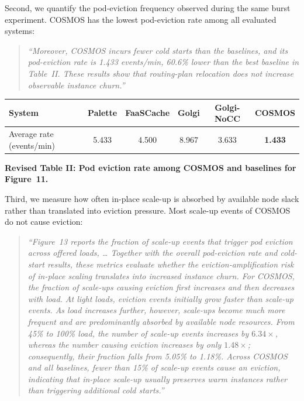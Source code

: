 \documentclass[11pt]{article}
\newcommand{\sysname}{COSMOS\xspace}
\newenvironment{revisionquote}{\begin{quote}\itshape}{\end{quote}}
\begin{document}
Second, we quantify the pod-eviction frequency observed during the same burst experiment. COSMOS has the lowest pod-eviction rate among all evaluated systems:

\begin{revisionquote}
``Moreover, COSMOS incurs fewer cold starts than the baselines, and its pod-eviction rate is 1.433 events/min, 60.6\% lower than the best baseline in Table~II. These results show that routing-plan relocation does not increase observable instance churn.''
\end{revisionquote}

\begin{center}
\small
\begin{tabular}{lccccc}
\toprule
\textbf{System} & \textbf{Palette} & \textbf{FaaSCache} & \textbf{Golgi} & \textbf{Golgi-NoCC} & \textbf{COSMOS} \\
\midrule
Average rate (events/min) & 5.433 & 4.500 & 8.967 & 3.633 & \textbf{1.433} \\
\bottomrule
\end{tabular}\par
\vspace{2pt}\small\textbf{Revised Table II: Pod eviction rate among COSMOS and baselines for Figure~11.}
\end{center}

Third, we measure how often in-place scale-up is absorbed by available node slack rather than translated into eviction pressure. Most scale-up events of \sysname do not cause eviction:

\begin{revisionquote}
``Figure~13 reports the fraction of scale-up events that trigger pod eviction across offered loads, \ldots{} Together with the overall pod-eviction rate and cold-start results, these metrics evaluate whether the eviction-amplification risk of in-place scaling translates into increased instance churn. For \sysname, the fraction of scale-ups causing eviction first increases and then
decreases with load. At light loads, eviction events initially grow faster than
scale-up events. As load increases further, however, scale-ups become much more
frequent and are predominantly absorbed by available node resources. From 45\%
to 100\% load, the number of scale-up events increases by $6.34\times$, whereas
the number causing eviction increases by only $1.48\times$; consequently, their
fraction falls from 5.05\% to 1.18\%.
Across \sysname and all baselines, fewer than 15\% of scale-up events cause an
eviction, indicating that in-place scale-up usually preserves warm instances
rather than triggering additional cold starts.''
\end{revisionquote}
\end{document}
